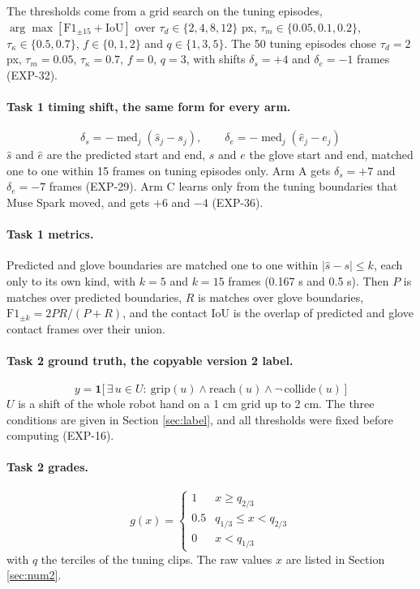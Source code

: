 \documentclass[10pt,twocolumn,letterpaper]{article}
\begin{document}
The thresholds come from a grid search on the tuning episodes,
$\arg\max [\mathrm{F1}_{\pm 15} + \mathrm{IoU}]$ over
$\tau_d \in \{2,4,8,12\}$ px, $\tau_m \in \{0.05,0.1,0.2\}$,
$\tau_\kappa \in \{0.5,0.7\}$, $f \in \{0,1,2\}$ and $q \in \{1,3,5\}$. The
50 tuning episodes chose $\tau_d = 2$ px, $\tau_m = 0.05$,
$\tau_\kappa = 0.7$, $f = 0$, $q = 3$, with shifts $\delta_s = +4$ and
$\delta_e = -1$ frames (EXP-32).

\paragraph{Task 1 timing shift, the same form for every arm.}
\begin{equation}
\delta_s = -\operatorname{med}_j(\hat{s}_j - s_j), \qquad
\delta_e = -\operatorname{med}_j(\hat{e}_j - e_j)
\end{equation}
$\hat{s}$ and $\hat{e}$ are the predicted start and end, $s$ and $e$ the glove
start and end, matched one to one within 15 frames on tuning episodes only.
Arm A gets $\delta_s = +7$ and $\delta_e = -7$ frames (EXP-29). Arm C learns
only from the tuning boundaries that Muse Spark moved, and gets $+6$ and $-4$
(EXP-36).

\paragraph{Task 1 metrics.} Predicted and glove boundaries are matched one to
one within $|\hat{s} - s| \le k$, each only to its own kind, with
$k = 5$ and $k = 15$ frames (0.167 s and 0.5 s). Then
$P$ is matches over predicted boundaries, $R$ is matches over glove
boundaries, $\mathrm{F1}_{\pm k} = 2PR/(P+R)$, and the contact IoU is the
overlap of predicted and glove contact frames over their union.

\paragraph{Task 2 ground truth, the copyable version 2 label.}
\begin{equation}
y = \mathbf{1}\big[\, \exists\, u \in U:\
\mathrm{grip}(u) \wedge \mathrm{reach}(u) \wedge \neg\,\mathrm{collide}(u) \,\big]
\end{equation}
$U$ is a shift of the whole robot hand on a 1 cm grid up to 2 cm. The three
conditions are given in Section \ref{sec:label}, and all thresholds were fixed
before computing (EXP-16).

\paragraph{Task 2 grades.}
\begin{equation}
g(x) =
\begin{cases}
1 & x \ge q_{2/3}\\
0.5 & q_{1/3} \le x < q_{2/3}\\
0 & x < q_{1/3}
\end{cases}
\end{equation}
with $q$ the terciles of the tuning clips. The raw values $x$ are listed in
Section \ref{sec:num2}.
\end{document}
